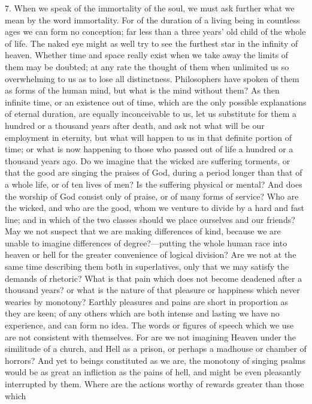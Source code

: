 7. When we speak of the immortality of the soul, we must ask further what
we mean by the word immortality. For of the duration of a living being in
countless ages we can form no conception; far less than a three years' old
child of the whole of life. The naked eye might as well try to see the
furthest star in the infinity of heaven. Whether time and space really
exist when we take away the limits of them may be doubted; at any rate the
thought of them when unlimited us so overwhelming to us as to lose all
distinctness. Philosophers have spoken of them as forms of the human mind,
but what is the mind without them? As then infinite time, or an existence
out of time, which are the only possible explanations of eternal duration,
are equally inconceivable to us, let us substitute for them a hundred or a
thousand years after death, and ask not what will be our employment in
eternity, but what will happen to us in that definite portion of time; or
what is now happening to those who passed out of life a hundred or a
thousand years ago. Do we imagine that the wicked are suffering torments,
or that the good are singing the praises of God, during a period longer
than that of a whole life, or of ten lives of men? Is the suffering
physical or mental? And does the worship of God consist only of praise, or
of many forms of service? Who are the wicked, and who are the good, whom
we venture to divide by a hard and fast line; and in which of the two
classes should we place ourselves and our friends? May we not suspect that
we are making differences of kind, because we are unable to imagine
differences of degree?—putting the whole human race into heaven or
hell for the greater convenience of logical division? Are we not at the
same time describing them both in superlatives, only that we may satisfy
the demands of rhetoric? What is that pain which does not become deadened
after a thousand years? or what is the nature of that pleasure or
happiness which never wearies by monotony? Earthly pleasures and pains are
short in proportion as they are keen; of any others which are both intense
and lasting we have no experience, and can form no idea. The words or
figures of speech which we use are not consistent with themselves. For are
we not imagining Heaven under the similitude of a church, and Hell as a
prison, or perhaps a madhouse or chamber of horrors? And yet to beings
constituted as we are, the monotony of singing psalms would be as great an
infliction as the pains of hell, and might be even pleasantly interrupted
by them. Where are the actions worthy of rewards greater than those which
